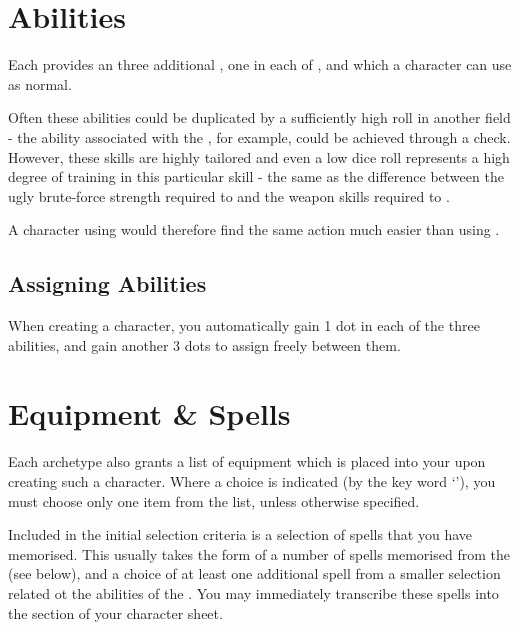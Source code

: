\section{ Abilities} 

Each  provides an three additional , one in each of ,  and  which a character can use as normal. 

Often these abilities could be duplicated by a sufficiently high roll in another field - the  ability associated with the , for example, could be achieved through a  check. However, these skills are highly tailored and even a low dice roll represents a high degree of training in this particular skill - the same as the difference between the ugly brute-force strength required to  and the weapon skills required to .

A character using  would therefore find the same action much easier than using . 

\subsection{Assigning  Abilities} 

When creating a character, you automatically gain 1 dot in each of the three  abilities, and gain another 3 dots to assign freely between them.  

\section{ Equipment \& Spells}

Each archetype also grants a list of equipment which is placed into your  upon creating such a character. Where a choice is indicated (by the key word `'), you must choose only one item from the list, unless otherwise specified. 


Included in the initial selection criteria is a selection of spells that you have memorised. This usually takes the form of a number of spells memorised from the  (see below), and a choice of at least one additional spell from a smaller selection related ot the abilities of the . You may immediately transcribe these spells into the  section of your character sheet. 


